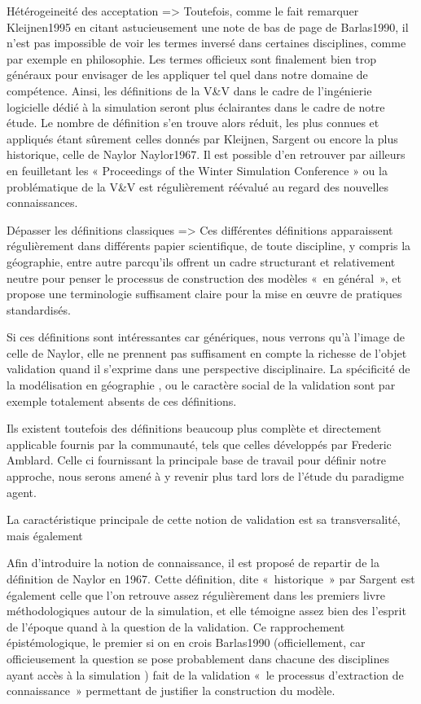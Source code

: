 Hétérogeineité des acceptation => Toutefois, comme le fait remarquer {Kleijnen1995} en citant astucieusement une note de bas de page de {Barlas1990}, il n'est pas impossible de voir les termes inversé dans certaines disciplines, comme par exemple en philosophie. Les termes officieux sont finalement bien trop généraux pour envisager de les appliquer tel quel dans notre domaine de compétence. Ainsi, les définitions de la V\&V dans le cadre de l'ingénierie logicielle dédié à la simulation seront plus éclairantes dans le cadre de notre étude. Le nombre de définition s'en trouve alors réduit, les plus connues et appliqués étant sûrement celles donnés par Kleijnen, Sargent ou encore la plus historique, celle de Naylor {Naylor1967}. Il est possible d'en retrouver par ailleurs en feuilletant les « Proceedings of the Winter Simulation Conference » ou la problématique de la V&V est régulièrement réévalué au regard des nouvelles connaissances. 

Dépasser les définitions classiques => Ces différentes définitions apparaissent régulièrement dans différents papier scientifique, de toute discipline, y compris la géographie, entre autre parcqu'ils offrent un cadre structurant et relativement neutre pour penser le processus de construction des modèles « en général », et propose une terminologie suffisament claire pour la mise en œuvre de pratiques standardisés. 

Si ces définitions sont intéressantes car génériques, nous verrons qu'à l'image de celle de Naylor, elle ne prennent pas suffisament en compte la richesse de l'objet validation quand il s'exprime dans une perspective disciplinaire. La spécificité de la modélisation en géographie , ou le caractère social de la validation sont par exemple totalement absents de ces définitions. 

Ils existent toutefois des définitions beaucoup plus complète et directement applicable fournis par la communauté, tels que celles développés par Frederic Amblard. Celle ci fournissant la principale base de travail pour définir notre approche, nous serons amené à y revenir plus tard lors de l'étude du paradigme agent.

La caractéristique principale de cette notion de validation est sa transversalité, mais également  

Afin d'introduire la notion de connaissance, il est proposé de repartir de la définition de Naylor en 1967. Cette définition, dite  « historique » par Sargent est également celle que l'on retrouve assez régulièrement dans les premiers livre méthodologiques autour de la simulation, et elle témoigne assez bien des l'esprit de l'époque quand à la question de la validation. 
Ce rapprochement épistémologique, le premier si on en crois {Barlas1990} (officiellement, car officieusement la question se pose probablement dans chacune des disciplines ayant accès à la simulation ) fait de la validation « le processus d'extraction de connaissance » permettant de justifier la construction du modèle. 

